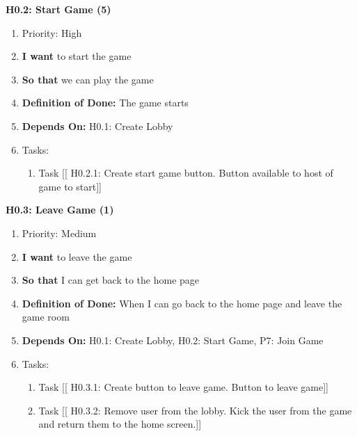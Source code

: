 \textbf{H0.2: Start Game (5)}
\begin{enumerate}
    \item Priority: High
    \item \textbf{I want} to start the game
    \item \textbf{So that} we can play the game
    \item \textbf{Definition of Done:} The game starts
    \item \textbf{Depends On:} H0.1: Create Lobby
    \item Tasks:
    \begin{enumerate}
        \item Task [[ H0.2.1: Create start game button. Button available to host of game to start]]
    \end{enumerate}
\end{enumerate}

\vspace{2em}

\textbf{H0.3: Leave Game (1)}
\begin{enumerate}
    \item Priority: Medium
    \item \textbf{I want} to leave the game
    \item \textbf{So that} I can get back to the home page
    \item \textbf{Definition of Done:} When I can go back to the home page and leave the game room
    \item \textbf{Depends On:} H0.1: Create Lobby, H0.2: Start Game, P7: Join Game
    \item Tasks:
    \begin{enumerate}
        \item Task [[ H0.3.1: Create button to leave game. Button to leave game]]
        \item Task [[ H0.3.2: Remove user from the lobby. Kick the user from the game and return them to the home screen.]]
    \end{enumerate}
\end{enumerate}

\vspace{2em}

